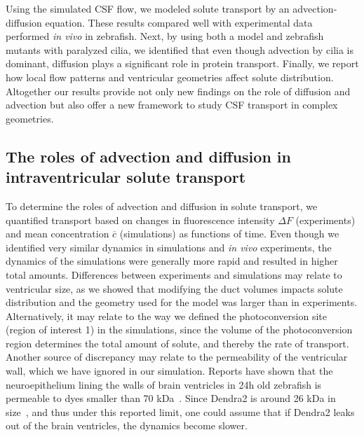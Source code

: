\documentclass[fleqn]{wlscirep}
\newcommand{\cbar}{\overline{c}}
\begin{document}
Using the simulated CSF flow, we modeled solute transport by an advection-diffusion equation.
These results compared well with experimental data performed \emph{in vivo} in zebrafish.
Next, by using both a model and zebrafish mutants with paralyzed cilia,
we identified that even though advection by cilia is dominant,
diffusion plays a significant role  in protein transport. Finally, we report how local
flow patterns and ventricular geometries affect solute distribution.
Altogether our results provide not only new findings on the role of
diffusion and advection but also offer a new framework to study CSF transport in complex geometries.

\subsection*{The roles of advection and diffusion in intraventricular solute transport}
To determine the roles of advection and diffusion in solute transport, we quantified transport
based on changes in fluorescence intensity $\Delta F$ (experiments) and
mean concentration $\cbar$ (simulations) as functions of time.
Even though we identified very similar dynamics in simulations and
\emph{in vivo} experiments, the dynamics of the simulations were generally
more rapid and resulted in higher total amounts.
Differences between experiments and simulations may relate to
ventricular size, as we showed that modifying the duct volumes impacts
solute distribution and the geometry used for the model was larger than in experiments.
Alternatively, it may relate to the way we defined the photoconversion site (region of interest 1)
in the simulations, since the volume of the photoconversion region determines
the total amount of solute, and thereby the rate of transport. Another source
of discrepancy may relate to the permeability of the ventricular wall,
which we have ignored in our simulation. Reports have shown that the
neuroepithelium lining the walls of brain ventricles in 24h old zebrafish
is permeable to dyes smaller than 70 kDa~\cite{Chang2012AnNeuroepithelium}.
Since Dendra2 is around 26 kDa in size~\cite{Gurskaya2006EngineeringLight},
and thus under this reported limit, one could assume that if Dendra2
leaks out of the brain ventricles, the dynamics become slower.
\end{document}
